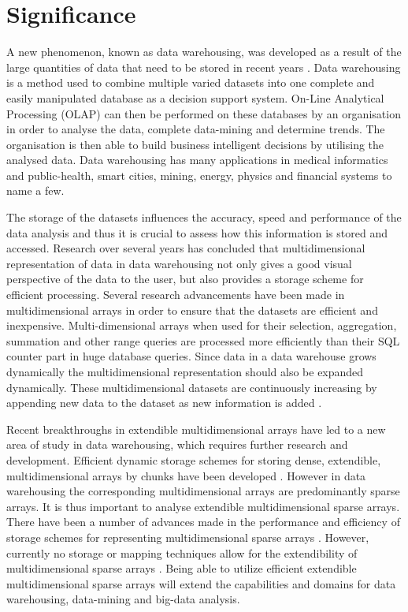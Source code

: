 \section{Significance}
A new phenomenon, known as data warehousing, was developed as a result of the large quantities of data that need to be stored in recent years \cite{golfarelli:2009:dwd}. Data warehousing is a method used to combine multiple varied datasets into one complete and easily manipulated database as a decision support system. On-Line Analytical Processing (OLAP) can then be performed on these databases by an organisation in order to analyse the data, complete data-mining and determine trends. The organisation is then able to build business intelligent decisions by utilising the analysed data. Data warehousing has many applications in medical informatics and public-health, smart cities, mining, energy, physics and financial systems to name a few.

The storage of the datasets influences the accuracy, speed and performance of the data analysis and thus it is crucial to assess how this information is stored and accessed. Research over several years has concluded that multidimensional representation of data in data warehousing not only gives a good visual perspective of the data to the user, but also provides a storage scheme for efficient processing. Several research advancements have been made in multidimensional arrays in order to ensure that the datasets are efficient and inexpensive. Multi-dimensional arrays when used for their selection, aggregation, summation and other range queries are processed more efficiently than their SQL counter part in huge database queries. Since data in a data warehouse grows dynamically the multidimensional representation should also be expanded dynamically. These multidimensional datasets are continuously increasing by appending new data to the dataset as new information is added \cite{otoo:2006:esa}.

Recent breakthroughs in extendible multidimensional arrays have led to a new area of study in data warehousing, which requires further research and development. Efficient dynamic storage schemes for storing dense, extendible, multidimensional arrays by chunks have been developed \cite{nimako:2012:ced,pedereira:2015:cas}. However in data warehousing the corresponding multidimensional arrays are predominantly sparse arrays. It is thus important to analyse extendible multidimensional sparse arrays. There have been a number of advances made in the performance and efficiency of storage schemes for representing multidimensional sparse arrays \cite{otoo:2016:msa,goil:bess,otoo:2014:nas}. However, currently no storage or mapping techniques allow for the extendibility of multidimensional sparse arrays \cite{nimako:2016:cea}. Being able to utilize efficient extendible multidimensional sparse arrays will extend the capabilities and domains for data warehousing, data-mining and big-data analysis.

